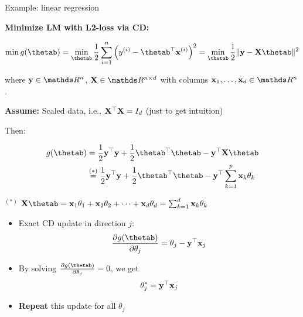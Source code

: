 \documentclass[11pt,compress,t,notes=noshow, xcolor=table]{beamer}
\begin{document}
\begin{vbframe}{Example: linear regression}

\textbf{Minimize LM with L2-loss via CD:}
\vspace*{0.2cm}

$$
    \min g(\thetab) = \min_{\thetab} \frac{1}{2}\sumin \left(y^{(i)} - \thetab^\top \xi\right)^2 = \min_{\thetab} \frac{1}{2}\|\yv - \Xmat \thetab\|^2 
$$

where $\yv \in \R^n$, $\Xmat \in \R^{n \times d}$ with columns $\xv_1, \ldots, \xv_d \in \R^n$. 

\vspace*{0.3cm}

\textbf{Assume:} Scaled data, i.e., $\mathbf{X}^\top \mathbf{X} = I_d$ (just to get intuition)

\medskip

Then:

\vspace{-\baselineskip}

\begin{footnotesize}
\begin{align*}
    g(\thetab) &= \frac{1}{2}\yv^\top \yv + \frac{1}{2}\thetab^\top \thetab - \yv^\top \Xmat \thetab  \\
    &\overset{(*)}{=} \frac{1}{2}\yv^\top \yv + \frac{1}{2}\thetab^\top \thetab - \yv^\top \sum_{k = 1}^p \xv_k \theta_k 
\end{align*}

$^{(*)}$ $\Xmat \thetab = \xv_1 \theta_1 + \xv_2 \theta_2 + \cdots + \xv_d \theta_d = \sum_{k = 1}^d \xv_k \theta_k$
\end{footnotesize}

\framebreak

\begin{itemize}
    \item Exact CD update in direction $j$:
        \begin{equation*}
            \frac{\partial{g}(\thetab)}{\partial \theta_j} = \theta_j - \yv^\top \xv_j 
        \end{equation*}
    \item By solving $\frac{\partial{g}(\thetab)}{\partial \theta_j} = 0$, we get 
        \begin{equation*}
            \theta_j^\ast = \mathbf{y}^\top \mathbf{x}_j
        \end{equation*}
    \item \textbf{Repeat} this update for all $\theta_j$
\end{itemize}



\end{vbframe}
\end{document}
